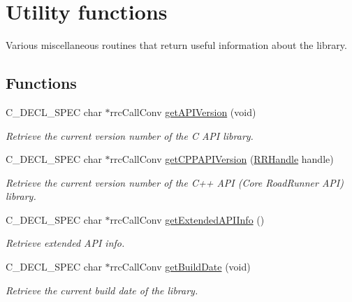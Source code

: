 \hypertarget{group__utility}{}\section{Utility functions}
\label{group__utility}


Various miscellaneous routines that return useful information about the library.  


\subsection*{Functions}
\begin{DoxyCompactItemize}
\item 
C\+\_\+\+D\+E\+C\+L\+\_\+\+S\+P\+E\+C char $\ast$rrc\+Call\+Conv \hyperlink{group__utility_ga205f62add6103bac0fb26cad7e2e5914}{get\+A\+P\+I\+Version} (void)
\begin{DoxyCompactList}\small\item\em Retrieve the current version number of the C A\+P\+I library. \end{DoxyCompactList}\item 
C\+\_\+\+D\+E\+C\+L\+\_\+\+S\+P\+E\+C char $\ast$rrc\+Call\+Conv \hyperlink{group__utility_ga176e563b3d7f32037c56ba1273d4c919}{get\+C\+P\+P\+A\+P\+I\+Version} (\hyperlink{rrc__types_8h_a1d68f0592372208fa5a5f2799ea4b3ae}{R\+R\+Handle} handle)
\begin{DoxyCompactList}\small\item\em Retrieve the current version number of the C++ A\+P\+I (Core Road\+Runner A\+P\+I) library. \end{DoxyCompactList}\item 
C\+\_\+\+D\+E\+C\+L\+\_\+\+S\+P\+E\+C char $\ast$rrc\+Call\+Conv \hyperlink{group__utility_gafce4606b138efa3b17e28f3966c1b93c}{get\+Extended\+A\+P\+I\+Info} ()
\begin{DoxyCompactList}\small\item\em Retrieve extended A\+P\+I info. \end{DoxyCompactList}\item 
C\+\_\+\+D\+E\+C\+L\+\_\+\+S\+P\+E\+C char $\ast$rrc\+Call\+Conv \hyperlink{group__utility_ga6ffcdff4d0099d5c94fee9d1abf93f3d}{get\+Build\+Date} (void)
\begin{DoxyCompactList}\small\item\em Retrieve the current build date of the library. \end{DoxyCompactList}\item 

\end{DoxyCompactItemize}
